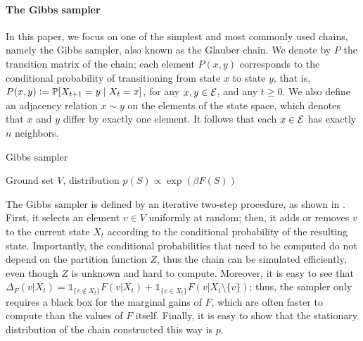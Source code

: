 \paragraph{The Gibbs sampler}
In this paper, we focus on one of the simplest and most commonly used chains, namely the Gibbs sampler, also known as the Glauber chain.
We denote by $P$ the transition matrix of the chain; each element $P(x, y)$ corresponds to the conditional probability of transitioning from state $x$ to state $y$, that is, $P(x, y) \defeq \P[X_{t+1} = y \mid X_{t} = x]$, for any $x, y \in \ss$, and any $t \geq 0$.
We also define an adjacency relation $x \sim y$ on the elements of the state space, which denotes that $x$ and $y$ differ by exactly one element.
It follows that each $x \in \ss$ has exactly $n$ neighbors.

\begin{algorithm}[tb]
	\caption{Gibbs sampler}
	\label{alg:gibbs}
	\begin{algorithmic}[1]
		\REQUIRE Ground set $V$, distribution $p(S) \propto \exp(\beta F(S))$
		\ENDFOR
	\end{algorithmic}
\end{algorithm}

The Gibbs sampler is defined by an iterative two-step procedure, as shown in .
First, it selects an element $v \in V$ uniformly at random; then, it adds or removes $v$ to the current state $X_t$ according to the conditional probability of the resulting state.
Importantly, the conditional probabilities that need to be computed do not depend on the partition function $Z$, thus the chain can be simulated efficiently, even though $Z$ is unknown and hard to compute.
Moreover, it is easy to see that $\Delta_F(v | X_t) = \mathds{1}_{\{v\not\in X_t\}}F(v|X_t) + \mathds{1}_{\{v\in X_t\}}F(v|X_t\setminus\{v\})$; thus, the sampler only requires a black box for the marginal gains of $F$, which are often faster to compute than the values of $F$ itself.
Finally, it is easy to show that the stationary distribution of the chain constructed this way is $p$.

